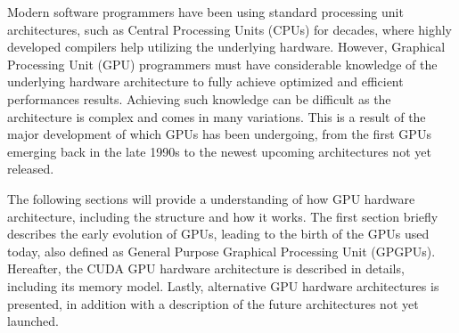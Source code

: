 Modern software programmers have been using standard processing unit architectures, such as Central Processing Units (CPUs) for decades, where highly developed compilers help utilizing the underlying hardware.
However, Graphical Processing Unit (GPU) programmers must have considerable knowledge of the underlying hardware architecture to fully achieve optimized and efficient performances results.
Achieving such knowledge can be difficult as the architecture is complex and comes in many variations.
This is a result of the major development of which GPUs has been undergoing, from the first GPUs emerging back in the late 1990s to the newest upcoming architectures not yet released.

The following sections will provide a understanding of how GPU hardware architecture, including the structure and how it works.
The first section briefly describes the early evolution of GPUs, leading to the birth of the GPUs used today, also defined as General Purpose Graphical Processing Unit (GPGPUs).
Hereafter, the CUDA GPU hardware architecture is described in details, including its memory model.
Lastly, alternative GPU hardware architectures is presented, in addition with a description of 
the future architectures not yet launched.



 